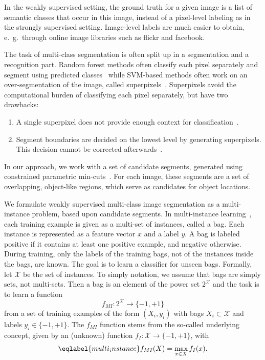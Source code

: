 \documentclass{llncs} %
\begin{document}
In the weakly supervised setting, the ground
 truth for a given image is a list of semantic classes that occur in this image, instead of a pixel-level
labeling as in the strongly supervised setting.
Image-level labels are much easier to obtain, e.~g.\  through online image libraries such as flickr and facebook.

The task of multi-class segmentation is often split up in a segmentation
and a recognition part. Random forest methods often classify each pixel
separately and segment using predicted classes~\citep{schroff2008object} while SVM-based methods often work on an
over-segmentation of the image, called superpixels~\citep{ladicky2009associative,gonfaus2010harmony}. Superpixels avoid the
computational burden of classifying each pixel separately, but have
two drawbacks:
\begin{enumerate}
    \item A single superpixel does not provide enough context for classification~\citep{fulkerson2009class}.
    \item Segment boundaries are decided on the lowest level by generating
        superpixels. This decision cannot be corrected afterwards~\citep{hanbury2008superpixels}.
\end{enumerate}
In our approach, we work with a set of candidate segments, generated using constrained parametric min-cuts~\citep{carreira2010constrained}.
For each image, these segments are a set of overlapping, object-like regions, which serve
as candidates for object locations.

We formulate weakly supervised multi-class image segmentation as a multi-instance problem, based upon candidate segments.
In multi-instance learning~\citep{dietterich1997solving}, each training example is given as a multi-set of instances, called a bag.
Each instance is represented as a feature vector $x$ and a label $y$.
A bag is labeled positive if it contains at least one positive example, and negative otherwise.
During training, only the labels of the training bags, not of the instances inside the bags, are known.
The goal is to learn a classifier for unseen bags. 
Formally, let $\mathcal{X}$ be the set of instances. To simply notation, we assume that bags are simply sets, not multi-sets.
Then a bag is an element of the power set $2^\mathcal{X}$ and the task is
to learn a function
\begin{equation} f_{MI} \colon 2^\mathcal{X} \rightarrow \{-1,+1\}  \end{equation}
from a set of training examples of the form $(X_i,y_i)$ with bags $X_i \subset \mathcal{X}$ and labels $y_i \in \{-1,+1\}$.
The $f_{MI}$ function stems from the so-called underlying concept, given by an (unknown) function
$f_{I} \colon \mathcal{X} \rightarrow \{-1,+1\}$, with 
\begin{equation}\eqlabel{multi_instance}
f_{MI}(X)= \max_{x \in X} f_{I}(x).
\end{equation}
\end{document}
